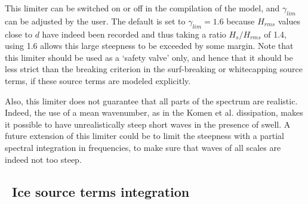 This limiter can be switched on or off in the
compilation of the model, and $\gamma_{lim}$ can be adjusted by the user. The
default is set to $\gamma_{lim} = 1.6$ because $H_{rms}$ values close to $d$
have indeed been recorded and thus taking a ratio $H_s/H_{rms}$ of 1.4, using
1.6 allows this large steepness to be exceeded by some margin.  Note that this
limiter should be used as a `safety valve' only, and hence that it should be
less strict than the breaking criterion in the surf-breaking or whitecapping
source terms, if these source terms are modeled explicitly.

Also, this limiter does not guarantee that all parts of the spectrum are
realistic. Indeed, the use of a mean wavenumber, as in the Komen et
al. dissipation, makes it possible to have unrealistically steep short waves
in the presence of swell. A future extension of this limiter could be to limit
the steepness with a partial spectral integration in frequencies, to make sure
that waves of all scales are indeed not too steep.

\vssub
\subsection{~Ice source terms integration} \label{sub:icesource}
\vssub

